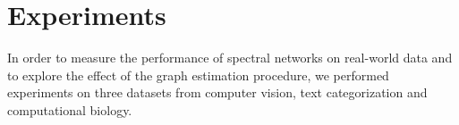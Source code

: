 %
%
%
%
%
%
%
%
%
%
%
%
%
%

\section{Experiments}

In order to measure the performance of spectral networks on real-world data and to explore the effect of the graph estimation procedure, we performed experiments on three datasets from computer vision, text categorization and computational biology. 

